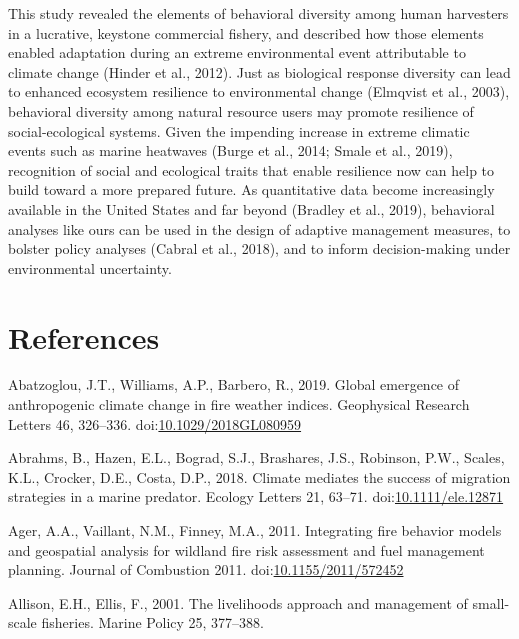 \documentclass[]{elsarticle} %
\begin{document}
This study revealed the elements of behavioral diversity among human
harvesters in a lucrative, keystone commercial fishery, and described
how those elements enabled adaptation during an extreme environmental
event attributable to climate change (Hinder et al., 2012). Just as
biological response diversity can lead to enhanced ecosystem resilience
to environmental change (Elmqvist et al., 2003), behavioral diversity
among natural resource users may promote resilience of social-ecological
systems. Given the impending increase in extreme climatic events such as
marine heatwaves (Burge et al., 2014; Smale et al., 2019), recognition
of social and ecological traits that enable resilience now can help to
build toward a more prepared future. As quantitative data become
increasingly available in the United States and far beyond (Bradley et
al., 2019), behavioral analyses like ours can be used in the design of
adaptive management measures, to bolster policy analyses (Cabral et al.,
2018), and to inform decision-making under environmental uncertainty.

\hypertarget{refs}{%
\section*{References}\label{refs}}

\hypertarget{refs}{}
\leavevmode\hypertarget{ref-Abatzoglou2019}{}%
Abatzoglou, J.T., Williams, A.P., Barbero, R., 2019. Global emergence of
anthropogenic climate change in fire weather indices. Geophysical
Research Letters 46, 326--336.
doi:\href{https://doi.org/10.1029/2018GL080959}{10.1029/2018GL080959}

\leavevmode\hypertarget{ref-Abrahms2018}{}%
Abrahms, B., Hazen, E.L., Bograd, S.J., Brashares, J.S., Robinson, P.W.,
Scales, K.L., Crocker, D.E., Costa, D.P., 2018. Climate mediates the
success of migration strategies in a marine predator. Ecology Letters
21, 63--71.
doi:\href{https://doi.org/10.1111/ele.12871}{10.1111/ele.12871}

\leavevmode\hypertarget{ref-Ager2011}{}%
Ager, A.A., Vaillant, N.M., Finney, M.A., 2011. Integrating fire
behavior models and geospatial analysis for wildland fire risk
assessment and fuel management planning. Journal of Combustion 2011.
doi:\href{https://doi.org/10.1155/2011/572452}{10.1155/2011/572452}

\leavevmode\hypertarget{ref-Ellis2001}{}%
Allison, E.H., Ellis, F., 2001. The livelihoods approach and management
of small-scale fisheries. Marine Policy 25, 377--388.
\end{document}
